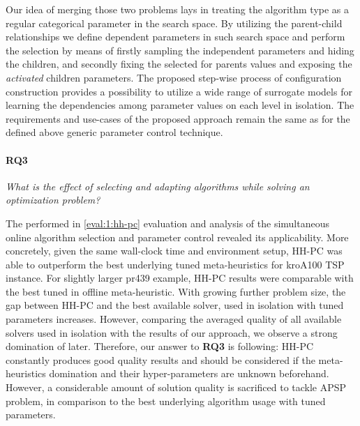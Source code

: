 Our idea of merging those two problems lays in treating the algorithm type as a regular categorical parameter in the search space. By utilizing the parent-child relationships we define dependent parameters in such search space and perform the selection by means of firstly sampling the independent parameters and hiding the children, and secondly fixing the selected for parents values and exposing the \emph{activated} children parameters. The proposed step-wise process of configuration construction provides a possibility to utilize a wide range of surrogate models for learning the dependencies among parameter values on each level in isolation. The requirements and use-cases of the proposed approach remain the same as for the defined above generic parameter control technique.


\paragraph{RQ3} \emph{What is the effect of selecting and adapting algorithms while solving an optimization problem?}

The performed in \cref{eval:1:hh-pc} evaluation and analysis of the simultaneous online algorithm selection and parameter control revealed its applicability. More concretely, given the same wall-clock time and environment setup, HH-PC was able to outperform the best underlying tuned meta-heuristics for kroA100 TSP instance. For slightly larger pr439 example, HH-PC results were comparable with the best tuned in offline meta-heuristic. With growing further problem size, the gap between HH-PC and the best available solver, used in isolation with tuned parameters increases. However, comparing the averaged quality of all available solvers used in isolation with the results of our approach, we observe a strong domination of later. Therefore, our answer to \textbf{RQ3} is following: HH-PC constantly produces good quality results and should be considered if the meta-heuristics domination and their hyper-parameters are unknown beforehand. However, a considerable amount of solution quality is sacrificed to tackle APSP problem, in comparison to the best underlying algorithm usage with tuned parameters.


